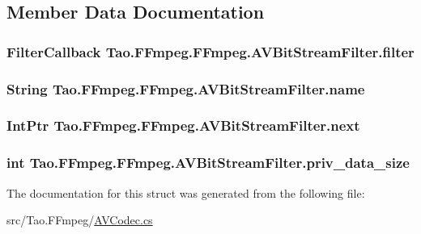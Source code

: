\subsection{Member Data Documentation}
\hypertarget{struct_tao_1_1_f_fmpeg_1_1_f_fmpeg_1_1_a_v_bit_stream_filter_a2fc5512a328289309cad3e4bd31a777c}{
\subsubsection[{filter}]{\setlength{\rightskip}{0pt plus 5cm}FilterCallback {\bf Tao.FFmpeg.FFmpeg.AVBitStreamFilter.filter}}}
\label{struct_tao_1_1_f_fmpeg_1_1_f_fmpeg_1_1_a_v_bit_stream_filter_a2fc5512a328289309cad3e4bd31a777c}
\hypertarget{struct_tao_1_1_f_fmpeg_1_1_f_fmpeg_1_1_a_v_bit_stream_filter_a8697a6a8c26937c20b133c2a9c9c91c8}{
\subsubsection[{name}]{\setlength{\rightskip}{0pt plus 5cm}String {\bf Tao.FFmpeg.FFmpeg.AVBitStreamFilter.name}}}
\label{struct_tao_1_1_f_fmpeg_1_1_f_fmpeg_1_1_a_v_bit_stream_filter_a8697a6a8c26937c20b133c2a9c9c91c8}
\hypertarget{struct_tao_1_1_f_fmpeg_1_1_f_fmpeg_1_1_a_v_bit_stream_filter_af1354f61c38a045df497a6674ddadf60}{
\subsubsection[{next}]{\setlength{\rightskip}{0pt plus 5cm}IntPtr {\bf Tao.FFmpeg.FFmpeg.AVBitStreamFilter.next}}}
\label{struct_tao_1_1_f_fmpeg_1_1_f_fmpeg_1_1_a_v_bit_stream_filter_af1354f61c38a045df497a6674ddadf60}
\hypertarget{struct_tao_1_1_f_fmpeg_1_1_f_fmpeg_1_1_a_v_bit_stream_filter_add16ef5ddc3a0ceb9a6951938b1eb151}{
\subsubsection[{priv\_\-data\_\-size}]{\setlength{\rightskip}{0pt plus 5cm}int {\bf Tao.FFmpeg.FFmpeg.AVBitStreamFilter.priv\_\-data\_\-size}}}
\label{struct_tao_1_1_f_fmpeg_1_1_f_fmpeg_1_1_a_v_bit_stream_filter_add16ef5ddc3a0ceb9a6951938b1eb151}


The documentation for this struct was generated from the following file:\begin{DoxyCompactItemize}
\item 
src/Tao.FFmpeg/\hyperlink{_a_v_codec_8cs}{AVCodec.cs}\end{DoxyCompactItemize}
